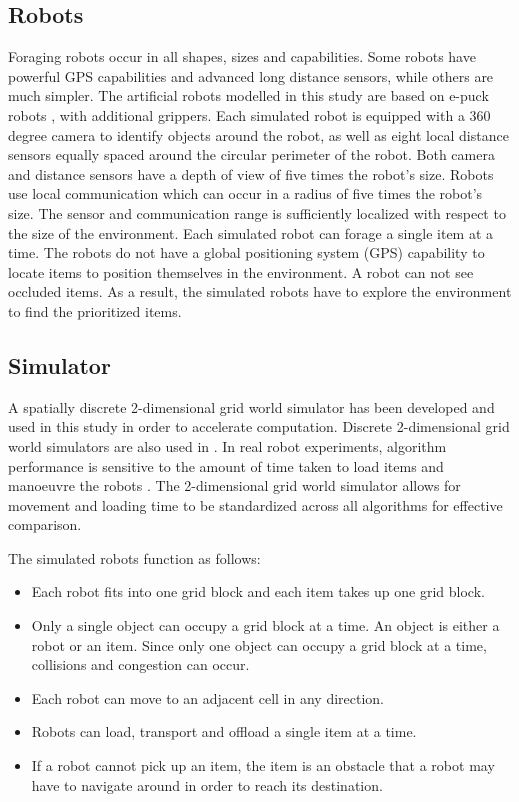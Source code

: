 \documentclass[preprint,12pt]{elsarticle}
\begin{document}
\subsection{Robots}
\label{chap:robots}

Foraging robots occur in all shapes, sizes and capabilities. Some robots have powerful GPS capabilities and advanced long distance sensors, while others are much simpler. The artificial robots modelled in this study are based on e-puck robots \cite{mondada2009puck}, with additional grippers. Each simulated robot is equipped with a 360 degree camera to identify objects around the robot, as well as eight local distance sensors equally spaced around the circular perimeter of the robot. Both camera and distance sensors have a depth of view of five times the robot's size. Robots use local communication which can occur in a radius of five times the robot's size. The sensor and communication range is sufficiently localized with respect to the size of the environment. Each simulated robot can forage a single item at a time. The robots do not have a global positioning system (GPS) capability to locate items to position themselves in the environment. A robot can not see occluded items. As a result, the simulated robots have to explore the environment to find the prioritized items.

\subsection{Simulator}
\label{simulator}
A spatially discrete 2-dimensional grid world simulator has been developed and used in this study in order to accelerate computation. Discrete 2-dimensional grid world simulators are also used in \cite{sugawara2002swarming, hecker2015beyond}. In real robot experiments, algorithm performance is sensitive to the amount of time taken to load items and manoeuvre the robots \cite{ostergaard2001emergent}. The 2-dimensional grid world simulator allows for movement and loading time to be standardized across all algorithms for effective comparison.

The simulated robots function as follows:
\begin{itemize}
	\item Each robot fits into one grid block and each item takes up one grid block. 
	\item Only a single object can occupy a grid block at a time.  An object is either a robot or an item. Since only one object can occupy a grid block at a time, collisions and congestion can occur.
	\item Each robot can move to an adjacent cell in any direction.
	\item Robots can load, transport and offload a single item at a time.
	\item If a robot cannot pick up an item, the item is an obstacle that a robot may have to navigate around in order to reach its destination.
\end{itemize}
\end{document}
